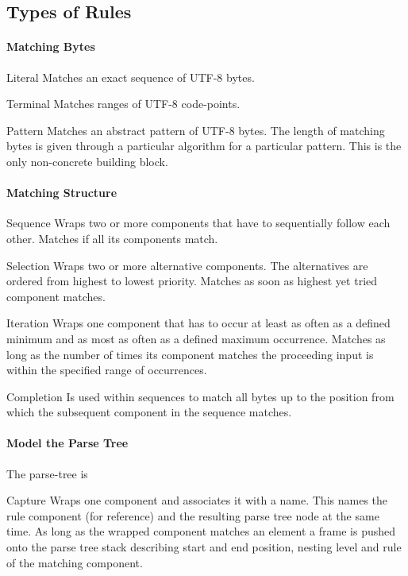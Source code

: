 \documentclass[10pt,a4paper]{article}
\begin{document}
\subsection{Types of Rules}
\paragraph{Matching Bytes}
\begin{rulelist}
\item[Literal] Matches an exact sequence of UTF-8 bytes.

\item[Terminal] Matches ranges of UTF-8 code-points.

\item[Pattern] Matches an abstract pattern of UTF-8 bytes. The length of matching bytes is given through a particular algorithm for a particular pattern. This is the only non-concrete building block.
\end{rulelist}

\paragraph{Matching Structure}
\begin{rulelist}
\item[Sequence] Wraps two or more components that have to sequentially follow each other. Matches if all its components match.

\item[Selection] Wraps two or more alternative components. The alternatives are ordered from highest to lowest priority. Matches as soon as highest yet tried component matches.

\item[Iteration] Wraps one component that has to occur at least as often as a defined minimum and as most as often as a defined maximum occurrence. Matches as long as the number of times its component matches the proceeding input is within the specified range of occurrences.

\item[Completion] Is used within sequences to match all bytes up to the position from which the subsequent component in the sequence matches.
\end{rulelist}

\paragraph{Model the Parse Tree}
The parse-tree is 
\begin{rulelist}
\item[Capture] Wraps one component and associates it with a name. This names the rule component (for reference) and the resulting parse tree node at the same time. As long as the wrapped component matches an element a frame is pushed onto the parse tree stack describing start and end position, nesting level and rule of the matching component.
\end{rulelist}
\end{document}
